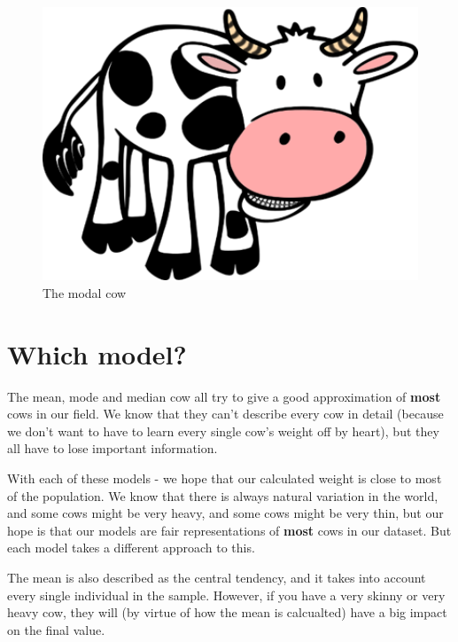 \documentclass[
]{book}
\begin{document}
\begin{figure}

{\centering \includegraphics[width=5.5in]{images/09_statbasic/modecow} 

}

\caption{The modal cow}\label{fig:unnamed-chunk-160}
\end{figure}

\hypertarget{stats_which}{%
\section{Which model?}\label{stats_which}}

The mean, mode and median cow all try to give a good approximation of \textbf{most} cows in our field. We know that they can't describe every cow in detail (because we don't want to have to learn every single cow's weight off by heart), but they all have to lose important information.

With each of these models - we hope that our calculated weight is close to most of the population. We know that there is always natural variation in the world, and some cows might be very heavy, and some cows might be very thin, but our hope is that our models are fair representations of \textbf{most} cows in our dataset. But each model takes a different approach to this.

The mean is also described as the central tendency, and it takes into account every single individual in the sample. However, if you have a very skinny or very heavy cow, they will (by virtue of how the mean is calcualted) have a big impact on the final value.
\end{document}
